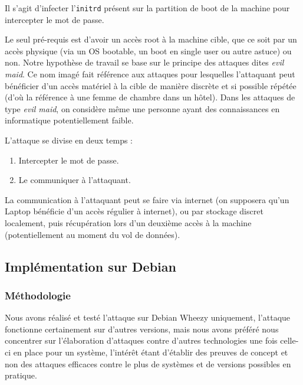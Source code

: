 \documentclass[12pt,a4paper]{article}
\begin{document}
Il s'agit d'infecter l'\texttt{initrd} présent sur la partition de boot de la
machine pour intercepter le mot de passe.


Le seul pré-requis est d'avoir un accès root à la machine cible, que ce soit
par un accès physique (via un OS bootable, un boot en single user ou autre
astuce) ou non. Notre hypothèse de travail se base sur le principe des attaques
dites \textit{evil maid}. Ce nom imagé fait référence aux attaques pour
lesquelles l'attaquant peut bénéficier d'un accès matériel à la cible de
manière discrète et si possible répétée (d'où la référence à une femme de
chambre dans un hôtel). Dans les attaques de type \textit{evil maid}, on
considère même une personne ayant des connaissances en informatique
potentiellement faible.

L'attaque se divise en deux temps :
\begin{enumerate}
    \item Intercepter le mot de passe.
    \item Le communiquer à l'attaquant.
\end{enumerate}

La communication à l'attaquant peut se faire via internet (on supposera qu'un
Laptop bénéficie d'un accès régulier à internet), ou par stockage discret
localement, puis récupération lors d'un deuxième accès à la machine
(potentiellement au moment du vol de données).

\subsection{Implémentation sur Debian}
\subsubsection*{Méthodologie}

Nous avons réalisé et testé l'attaque sur Debian Wheezy uniquement, l'attaque
fonctionne certainement sur d'autres versions, mais nous avons préféré nous
concentrer sur l'élaboration d'attaques contre d'autres technologies une fois
celle-ci en place pour un système, l'intérêt étant d'établir des preuves de 
concept et non des attaques efficaces contre le plus de systèmes et de versions
possibles en pratique.
\end{document}
